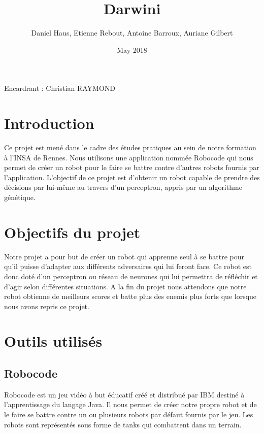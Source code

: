 \documentclass[12pt]{article}
\title{Darwini}
\author{Daniel Haus, Etienne Rebout, Antoine Barroux, Auriane Gilbert }
\date{May 2018}
\begin{document}
\maketitle
Encardrant : Christian RAYMOND

\newpage

\renewcommand{\contentsname}{Sommaire}
\tableofcontents

\newpage

\section{Introduction}

Ce projet est mené dans le cadre des études pratiques au sein de notre formation à l'INSA de Rennes. Nous utilisons une application nommée Robocode qui nous permet de créer un robot pour le faire se battre contre d'autres robots fournis par l'application. L'objectif de ce
projet est d'obtenir un robot capable de prendre des décisions par lui-même au
travers d'un perceptron, appris par un algorithme génétique.

\newpage

\section{Objectifs du projet}
Notre projet a pour but de créer un robot qui apprenne seul à se battre pour qu'il puisse d'adapter aux différents adversaires qui lui feront face. Ce robot est donc doté d'un perceptron ou réseau de neurones qui lui permettra de réfléchir et d'agir selon différentes situations. A la fin du projet nous attendons que notre robot obtienne de meilleurs scores et batte plus des enemis plus forts que lorsque nous avons repris ce projet.

\newpage

\section{Outils utilisés}

\subsection{Robocode}
Robocode est un jeu vidéo à but éducatif créé et distribué par IBM destiné à l'apprentissage du langage Java. Il nous permet de créer notre propre robot et de le faire se battre contre un ou plusieurs robots par défaut fournis par le jeu. Les robots sont représentés sous forme de tanks qui combattent dans un terrain.
\end{document}
